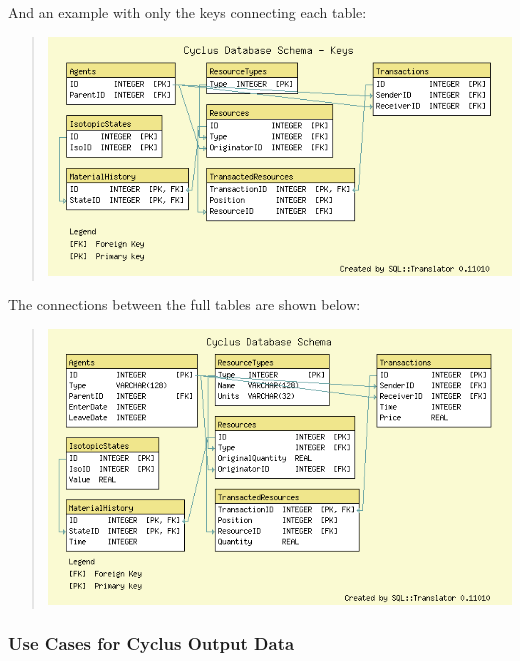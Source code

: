 \documentclass[letterpaper,10pt,english]{sphinxmanual}
\begin{document}
And an example with only the keys connecting each table:
\begin{quote}

\includegraphics{cycl_schema_keys.png}
\end{quote}

The connections between the full tables are shown below:
\begin{quote}

\includegraphics{cycl_schema.png}
\end{quote}


\subsubsection{Use Cases for Cyclus Output Data}
\label{devdoc/output_usecases:use-cases-for-cyclus-output-data}\label{devdoc/output_usecases::doc}
\end{document}
